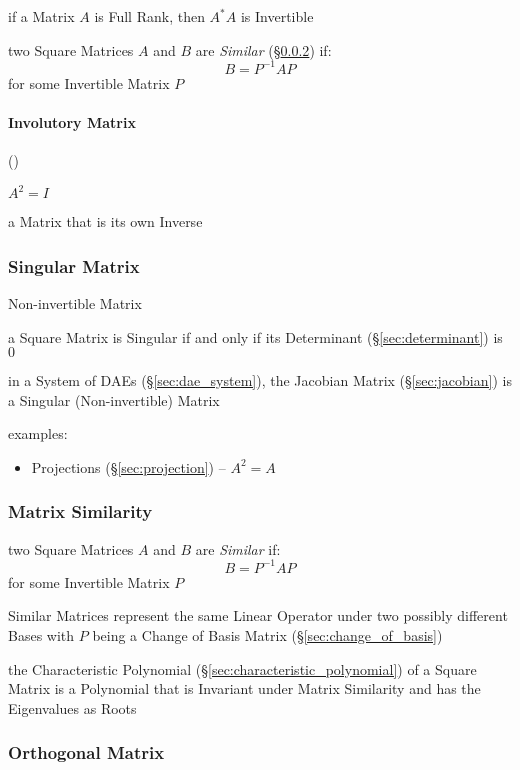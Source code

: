 if a Matrix $A$ is Full Rank, then $A^*A$ is Invertible

two Square Matrices $A$ and $B$ are \emph{Similar}
(\S\ref{sec:matrix_similarity}) if:
\[
  B = P^{-1}AP
\]
for some Invertible Matrix $P$



\paragraph{Involutory Matrix} (\label{sec:involutory_matrix})\hfill

$A^2 = I$

a Matrix that is its own Inverse



\subsubsection{Singular Matrix}\label{sec:singular_matrix}

Non-invertible Matrix

a Square Matrix is Singular if and only if its Determinant
(\S\ref{sec:determinant}) is $0$

\fist in a System of DAEs (\S\ref{sec:dae_system}), the Jacobian Matrix
(\S\ref{sec:jacobian}) is a Singular (Non-invertible) Matrix

examples:
\begin{itemize}
  \item Projections (\S\ref{sec:projection}) -- $A^2 = A$
\end{itemize}



\subsubsection{Matrix Similarity}\label{sec:matrix_similarity}

two Square Matrices $A$ and $B$ are \emph{Similar} if:
\[
  B = P^{-1}AP
\]
for some Invertible Matrix $P$

Similar Matrices represent the same Linear Operator under two possibly
different Bases with $P$ being a Change of Basis Matrix
(\S\ref{sec:change_of_basis})

the Characteristic Polynomial (\S\ref{sec:characteristic_polynomial}) of a
Square Matrix is a Polynomial that is Invariant under Matrix Similarity and has
the Eigenvalues as Roots



\subsubsection{Orthogonal Matrix}\label{sec:orthogonal_matrix}

